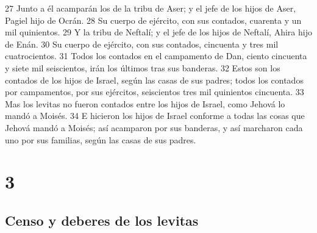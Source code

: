 27 Junto a él acamparán los de la tribu de Aser; y el jefe de los hijos de Aser, Pagiel hijo de Ocrán.
28 Su cuerpo de ejército, con sus contados, cuarenta y un mil quinientos.
29 Y la tribu de Neftalí; y el jefe de los hijos de Neftalí, Ahira hijo de Enán.
30 Su cuerpo de ejército, con sus contados, cincuenta y tres mil cuatrocientos.
31 Todos los contados en el campamento de Dan, ciento cincuenta y siete mil seiscientos, irán los últimos tras sus banderas.
32 Estos son los contados de los hijos de Israel, según las casas de sus padres; todos los contados por campamentos, por sus ejércitos, seiscientos tres mil quinientos cincuenta.
33 Mas los levitas no fueron contados entre los hijos de Israel, como Jehová lo mandó a Moisés.
34 E hicieron los hijos de Israel conforme a todas las cosas que Jehová mandó a Moisés; así acamparon por sus banderas, y así marcharon cada uno por sus familias, según las casas de sus padres.

\chapter{3}

\section*{Censo y deberes de los levitas}

